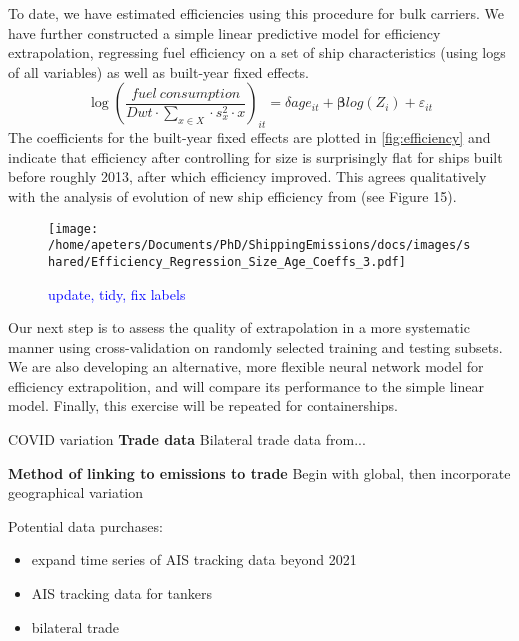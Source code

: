 \documentclass[hidelinks, 12pt,letterpaper]{article}
\begin{document}
To date, we have estimated efficiencies using this procedure for bulk carriers. We have further constructed a simple linear predictive model for efficiency extrapolation, regressing fuel efficiency on a set of ship characteristics (using logs of all variables) as well as built-year fixed effects. 
 \begin{equation}
 \log\left(
     \frac{fuel~consumption}{Dwt \cdot \sum_{x \in X}  \cdot s_x^2 \cdot x}
 \right)_{it}    
         = \delta age_{it} + \boldsymbol{\beta}log(Z_i) + \varepsilon_{it}
 \end{equation}
The coefficients for the built-year fixed effects are plotted in \autoref{fig:efficiency} and indicate that efficiency after controlling for size is surprisingly flat for ships built before roughly 2013, after which efficiency improved. This agrees qualitatively with the analysis of evolution of new ship efficiency from \citet{faber2015historical} (see Figure 15).

\begin{figure}[h]
  \centering
  \texttt{[image: /home/apeters/Documents/PhD/ShippingEmissions/docs/images/shared/Efficiency\_Regression\_Size\_Age\_Coeffs\_3.pdf]}
  \caption{\textcolor{blue}{update, tidy, fix labels}}
  \label{fig:efficiency}
\end{figure}

Our next step is to assess the quality of extrapolation in a more systematic manner using cross-validation on randomly selected training and testing subsets. We are also developing an alternative, more flexible neural network model for efficiency extrapolition, and will compare its performance to the simple linear model. Finally, this exercise will be repeated for containerships.

COVID variation
\textbf{Trade data} Bilateral trade data from...

\textbf{Method of linking to emissions to trade}
Begin with global, then incorporate geographical variation


\pagebreak
Potential data purchases:
\begin{itemize}
  \item expand time series of AIS tracking data beyond 2021
  \item AIS tracking data for tankers
  \item bilateral trade
\end{itemize}

\pagebreak
  
\singlespace{

}

 
\end{document}
